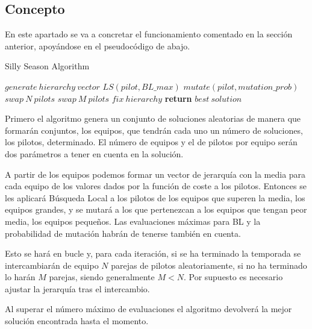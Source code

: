 \documentclass{article}
\begin{document}
	\subsection{Concepto}
	En este apartado se va a concretar el funcionamiento comentado en la sección anterior, apoyándose en el pseudocódigo de abajo.\par
	\begin{algorithm}
	\caption{Silly Season Algorithm}\label{sillyseason}
	\begin{algorithmic}[1]
			\EndFor
		\EndFor
		\State $generate\ hierarchy\ vector$
						\State $LS(pilot,BL\_max)$
					\EndFor
				\Else
						\State $mutate(pilot,mutation\_prob)$
					\EndFor
				\EndIf
			\EndFor
				\State $swap\ N\ pilots$
			\Else
				\State $swap\ M\ pilots$
			\EndIf
			\State $fix\ hierarchy$
		\EndWhile
		\State \textbf{return} $best\ solution$
	\EndProcedure
	\end{algorithmic}
	\end{algorithm}
	\newpage
	Primero el algoritmo genera un conjunto de soluciones aleatorias de manera que formarán conjuntos, los equipos, que tendrán cada uno un número de soluciones, los pilotos, determinado. El número de equipos y el de pilotos por equipo serán dos parámetros a tener en cuenta en la solución.
	\par
	A partir de los equipos podemos formar un vector de jerarquía con la media para cada equipo de los valores dados por la función de coste a los pilotos. Entonces se les aplicará Búsqueda Local a los pilotos de los equipos que superen la media, los equipos grandes, y se mutará a los que pertenezcan a los equipos que tengan peor media, los equipos pequeños. Las evaluaciones máximas para BL y la probabilidad de mutación habrán de tenerse también en cuenta.
	\par
	Esto se hará en bucle y, para cada iteración, si se ha terminado la temporada se intercambiarán de equipo $N$ parejas de pilotos aleatoriamente, si no ha terminado lo harán $M$ parejas, siendo generalmente $M<N$. Por supuesto es necesario ajustar la jerarquía tras el intercambio.
	\par
	Al superar el número máximo de evaluaciones el algoritmo devolverá la mejor solución encontrada hasta el momento.
	
\end{document}
